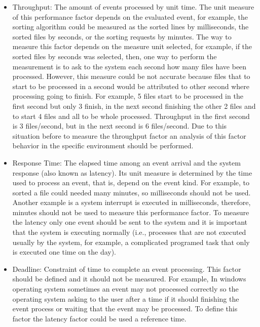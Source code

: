 \begin{itemize}
	\item Throughput: The amount of events processed by unit time. The unit measure of this performance factor depends on the evaluated event, for example, the sorting algorithm could be measured as the sorted lines by milliseconds, the sorted files by seconds, or the sorting requests by minutes.  The way to measure this factor depends on the measure unit selected, for example, if the sorted files by seconds was selected, then, one way to perform the measurement is to ask to the system each second how many files have been processed. However, this measure could be not accurate because files that to start to be processed in a second would be attributed to other second where processing going to finish. For example, 5 files start to be processed in the first second but only 3 finish, in the next second finishing the other 2 files and to start 4 files and all to be whole processed. Throughput in the first second is 3 files/second, but in the next second is 6 files/second. Due to this situation before to measure the throughput factor an analysis of this factor behavior in the specific environment should be performed.
	\item Response Time: The elapsed time among an event arrival and the system response (also known as latency). Its unit measure is determined by the time used to process an event, that is, depend on the event kind. For example, to sorted a file could needed many minutes, so milliseconds should not be used. Another example is a system interrupt is executed in milliseconds, therefore, minutes should not be used to measure this performance factor. To measure the latency only one event should be sent to the system and it is important that the system is executing normally (i.e., processes that are not executed usually by the system, for example, a complicated programed task that only is executed one time on the day).
	\item Deadline: Constraint of time to complete an event processing. This factor should be defined and it should not be measured. For example, In windows operating system sometimes an event may not processed correctly so the operating system asking to the user after a time if it should finishing the event process or waiting that the event may be processed. To define this factor the latency factor could be used a reference time.

\end{itemize}

